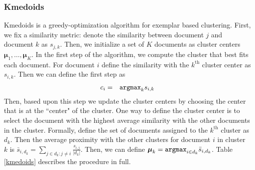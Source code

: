\documentclass[11pt,letterpaper]{article}
\numberwithin{equation}{section}
\begin{document}
\subsubsection{Kmedoids}
Kmedoids is a greedy-optimization algorithm for exemplar based
clustering.  First, we fix a similarity metric: denote the
similarity between document $j$ and document $k$ as $s_{j,k}$. Then,
we initialize a set of $K$ documents as cluster centers
$\boldsymbol{\mu}_1, \hdots, \boldsymbol{\mu}_K$.  In the first step
of the algorithm, we compute the cluster that best fits each
document.  For document $i$ define the similarity with the
$k^{\text{th}}$ cluster center as $s_{i,k}$.  Then we can define the
first step as
\begin{eqnarray}
c_i & = & {\tt arg max }_k  s_{i,k} \nonumber
\end{eqnarray}
Then, based upon this step we update the cluster centers by choosing
the center that is at the ``center" of the cluster.  One way to
define the cluster center is to select the document with the highest
average similarity with the other documents in the cluster.
Formally, define the set of documents assigned to the
$k^{\text{th}}$ cluster as $d_k$.
 Then the average proximity with the other clusters for document $i$
 in cluster $k$ is $\bar{s}_{i,d_k}  =  \sum_{j \in d_k: j \neq i}
 \frac{s_{i,j} }{ |d_k| }$.  Then, we can define $\boldsymbol{\mu}_k
 = {\tt arg max}_{i \in d_k} \bar{s}_{i,d_k} $.  Table
 \ref{kmedoids} describes the procedure in full.
\begin{table}[hbt!]
\caption{Kmedoids Algorithm} \label{kmedoids} 
\end{table}
\end{document}
